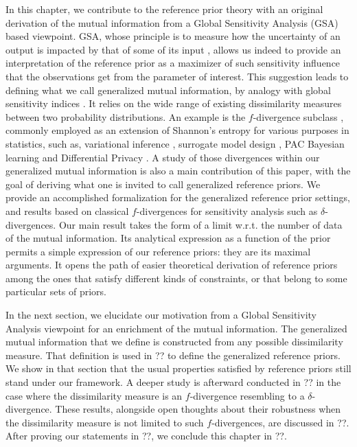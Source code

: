 In this chapter, we contribute to the reference prior theory with an original derivation of the mutual information from a Global Sensitivity Analysis (GSA) based viewpoint. %
GSA, whose principle is to measure how the uncertainty of an output is impacted by that of some of its input \citep{iooss_review_2015}, allows us indeed to provide %
an interpretation of the reference prior as a maximizer of such sensitivity influence that the observations get from the parameter of interest. 
This suggestion leads to defining what we call generalized mutual information, by analogy with global sensitivity indices \citep{da_veiga_basics_2021}. %
It relies on the wide range of existing dissimilarity measures between two probability distributions.
An example is the $f$-divergence subclass \citep{csiszar_information-type_1967}, commonly employed as an extension of  Shannon's entropy for various purposes in statistics, such as, variational inference \citep{minka_divergence_2005,bach_sum--squares_2023}, surrogate model design \citep{nguyen_surrogate_2009}, PAC Bayesian learning \citep{picard-weibel_change_2022} and Differential Privacy \citep{mironov_renyi_2017}.
%
A study of those divergences within our generalized mutual information is {also} a main contribution of this paper, with the goal of deriving what one is invited to call generalized reference priors.
We provide an accomplished formalization for the generalized reference prior settings, and results based on classical $f$-divergences for sensitivity analysis such as $\delta$-divergences.
{
Our main result takes the form of a limit w.r.t. the number of data of the mutual information. Its analytical expression as a function of the prior permits a simple expression of our reference priors: they are its maximal arguments. It opens the path of easier {theoretical} derivation of reference priors among the ones that satisfy different kinds of constraints, or that belong to some particular sets of priors.}


In the next section, %
we elucidate our motivation 
from a Global Sensitivity Analysis viewpoint for an enrichment of the mutual information. 
The generalized mutual information that we define is constructed from any possible dissimilarity measure.
That definition is used in ?? to define the generalized reference priors. We show in that section that the usual properties satisfied by reference priors still stand under our framework.
A deeper study is afterward conducted in ?? in the case where the dissimilarity measure is an $f$-divergence resembling to a $\delta$-divergence. 
These results, alongside open thoughts about their robustness when the dissimilarity measure is not limited to such $f$-divergences, are discussed in ??.
After proving our statements in ??, we conclude this chapter in ??.







